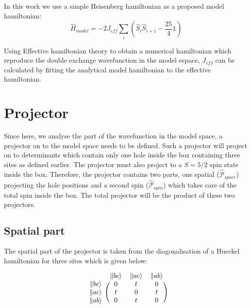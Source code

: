 \documentclass[12pt,twoside]{report}
\begin{document}
	In this work we use a simple Heisenberg hamiltonian as a proposed model hamiltonian:
	\begin{equation}
	\hat{H}_{model}=-2J_{eff}\sum_i (\hat{S}_i\hat{S}_{i+1}-\frac{25}{4}\mathbb{1})
	\end{equation}

	Using Effective hamiltonian theory \cite{heff} to obtain a numerical
	hamiltonian which reproduce the double exchange wavefunction in the model
	espace, $J_{eff}$ can be calculated by fitting the analytical model
	hamiltonian to the effective hamiltonian.

	\section{Projector}

	Since here, we analyse the part of the wavefunction in the model space, a
	projector on to the model space needs to be defined. Such a projector will
	project on to determinants which contain only one hole inside the box
	containing three sites as defined earlier. The projector must also project
	to a $S=5 \slash 2$ spin state inside the box. Therefore, the projector
	contains two parts, one spatial ($\hat{\mathcal{P}}_{space}$) projecting the
	hole positions and a second spin ($\hat{\mathcal{P}}_{spin}$) which takes
	care of the total spin inside the box. The total projector will be the
	product of these two projectors.

	\subsection{Spatial part}
	The spatial part of the projector is taken from the diagonalisation of a
	Hueckel hamiltonian for three sites which is given below:

	\begin{equation}
      \begin{blockarray}{cccc}
      & \|bc\rangle & \|ac\rangle & \|ab\rangle \\
      \begin{block}{c(ccc)}
        \|bc\rangle & 0 & t & 0 \\
        \|ac\rangle & t & 0 & t \\
        \|ab\rangle & 0 & t & 0 \\
      \end{block}
      \end{blockarray}
		\label{eq:demodel}
	\end{equation}
\end{document}
